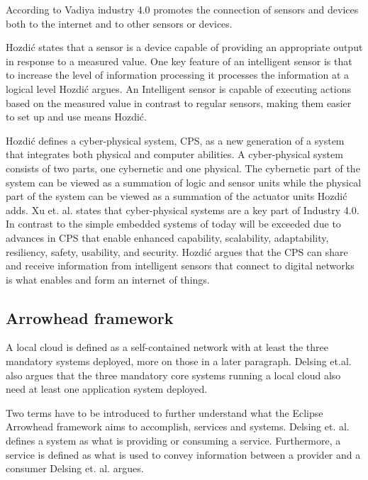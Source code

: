 According to Vadiya industry 4.0 promotes the connection of sensors and devices both to the internet and to other sensors or devices.\cite{Vaidya2018} 

Hozdić states that a sensor is a device capable of providing an appropriate output in response to a measured value.\cite{Hozdic2015}
One key feature of an intelligent sensor is that to increase the level of information processing it processes the information at a logical level Hozdić argues.\cite{Hozdic2015}
An Intelligent sensor  is capable of executing actions based on the measured value in contrast to regular sensors, making them easier to set up and use means Hozdić.\cite{Hozdic2015} 

Hozdić defines a cyber-physical system, CPS, as a new generation of a system that integrates both physical and computer abilities.\cite{Hozdic2015}
A cyber-physical system consists of two parts, one cybernetic and one physical.
The cybernetic part of the system can be viewed as a summation of logic and sensor units while the physical part of the system can be viewed as a summation of the actuator units Hozdić adds.\cite{Hozdic2015}
Xu et. al. states that cyber-physical systems are a key part of Industry 4.0. In contrast to the simple embedded systems of today will be exceeded due to advances in CPS that enable enhanced capability, scalability, adaptability, resiliency, safety, usability, and security.\cite{Xu2018}
Hozdić argues that the CPS can share and receive information from intelligent sensors that connect to digital networks is what enables and form an internet of things.\cite{Hozdic2015}
 
\subsection{Arrowhead framework}
A local cloud is defined as a self-contained network with at least the three mandatory systems deployed, more on those in a later paragraph. 
Delsing et.al. also argues that the three mandatory core systems running a local cloud also need at least one application system deployed.\cite{Delsing2017}

Two terms have to be introduced to further understand what the Eclipse Arrowhead framework aims to accomplish, services and systems.
Delsing et. al. defines a system as what is providing or consuming a service.\cite{Delsing2017} 
Furthermore, a service is defined as what is used to convey information between a provider and a consumer Delsing et. al. argues.\cite{Delsing2017}

